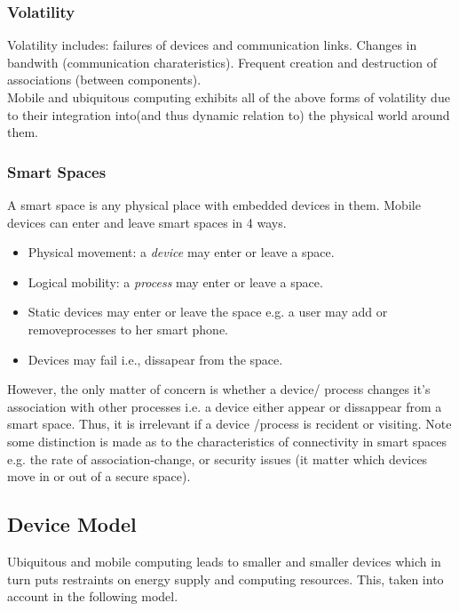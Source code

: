 \begin{comment}
Because of this, mobile computing is considered 'volatile'.  \\ 
\end{comment}

\subsubsection{Volatility}
\label{volatility}
Volatility includes: failures of devices and communication links. Changes in bandwith (communication charateristics). Frequent creation and destruction of associations (between components). \\
 
Mobile and ubiquitous computing exhibits all of the above forms of volatility due to their integration into(and thus dynamic relation to) the physical world around them.\\


\subsubsection{Smart Spaces}
A smart space is any physical place with embedded devices in them. Mobile devices can enter and leave smart spaces in 4 ways.

\begin{itemize}
\item Physical movement: a \textit{device} may enter or leave a space. 
\item Logical mobility: a \textit{process} may enter or leave a space. 
\item Static devices may enter or leave the space e.g. a user may add or removeprocesses to her smart phone. 
\item Devices may fail i.e., dissapear from the space. 
\end{itemize}




However, the only matter of concern is whether a device/ process changes it's association with other processes i.e. a device either appear or dissappear from a smart space. Thus, it is irrelevant if a device /process is recident or visiting. Note some distinction is made as to the characteristics of connectivity in smart spaces e.g. the rate of association-change, or security issues (it matter which devices move in or out of a secure space). \\

\subsection{Device Model}
Ubiquitous and mobile computing leads to smaller and smaller devices which in turn puts restraints on energy supply and computing resources. This, taken into account in the following model.\\

